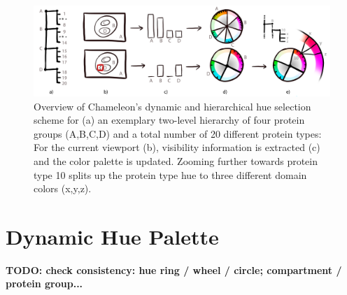 \documentclass{egpubl}
\begin{document}
		\begin{figure}[t]
			\centering
			\includegraphics[width=0.95\linewidth]{Figures/coloroverview}
			\caption{Overview of Chameleon's dynamic and hierarchical hue selection scheme for (a) an exemplary two-level hierarchy of four protein groups (A,B,C,D) and a total number of 20 different protein types: For the current viewport (b), visibility information is extracted (c) and the color palette is updated. Zooming further towards protein type 10 splits up the protein type hue to three different domain colors (x,y,z).}
			\label{fig:coloroverview}
		\end{figure}
	
	\section{Dynamic Hue Palette}
	\label{sec:hue}
	
	\textbf{TODO: check consistency: hue ring / wheel / circle; compartment / protein group...} 
	
\end{document}
